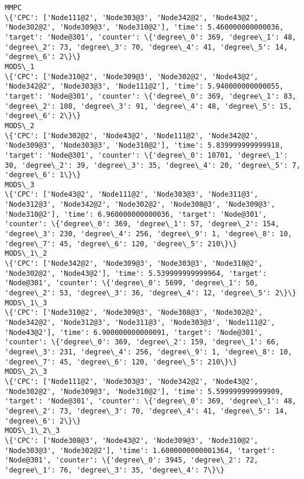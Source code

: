 \documentclass[11pt]{article}
\begin{document}
    \begin{Verbatim}[commandchars=\\\{\}]
MMPC
\{'CPC': ['Node111@2', 'Node303@3', 'Node342@2', 'Node43@2', 'Node302@2', 'Node309@3', 'Node310@2'], 'time': 5.460000000000036, 'target': 'Node@301', 'counter': \{'degree\_0': 369, 'degree\_1': 48, 'degree\_2': 73, 'degree\_3': 70, 'degree\_4': 41, 'degree\_5': 14, 'degree\_6': 2\}\}
MODS\_1
\{'CPC': ['Node310@2', 'Node309@3', 'Node302@2', 'Node43@2', 'Node342@2', 'Node303@3', 'Node111@2'], 'time': 5.940000000000055, 'target': 'Node@301', 'counter': \{'degree\_0': 369, 'degree\_1': 83, 'degree\_2': 108, 'degree\_3': 91, 'degree\_4': 48, 'degree\_5': 15, 'degree\_6': 2\}\}
MODS\_2
\{'CPC': ['Node302@2', 'Node43@2', 'Node111@2', 'Node342@2', 'Node309@3', 'Node303@3', 'Node310@2'], 'time': 5.839999999999918, 'target': 'Node@301', 'counter': \{'degree\_0': 10701, 'degree\_1': 30, 'degree\_2': 39, 'degree\_3': 35, 'degree\_4': 20, 'degree\_5': 7, 'degree\_6': 1\}\}
MODS\_3
\{'CPC': ['Node43@2', 'Node111@2', 'Node303@3', 'Node311@3', 'Node312@3', 'Node342@2', 'Node302@2', 'Node308@3', 'Node309@3', 'Node310@2'], 'time': 6.960000000000036, 'target': 'Node@301', 'counter': \{'degree\_0': 369, 'degree\_1': 57, 'degree\_2': 154, 'degree\_3': 230, 'degree\_4': 256, 'degree\_9': 1, 'degree\_8': 10, 'degree\_7': 45, 'degree\_6': 120, 'degree\_5': 210\}\}
MODS\_1\_2
\{'CPC': ['Node342@2', 'Node309@3', 'Node303@3', 'Node310@2', 'Node302@2', 'Node43@2'], 'time': 5.539999999999964, 'target': 'Node@301', 'counter': \{'degree\_0': 5699, 'degree\_1': 50, 'degree\_2': 53, 'degree\_3': 36, 'degree\_4': 12, 'degree\_5': 2\}\}
MODS\_1\_3
\{'CPC': ['Node310@2', 'Node309@3', 'Node308@3', 'Node302@2', 'Node342@2', 'Node312@3', 'Node311@3', 'Node303@3', 'Node111@2', 'Node43@2'], 'time': 6.900000000000091, 'target': 'Node@301', 'counter': \{'degree\_0': 369, 'degree\_2': 159, 'degree\_1': 66, 'degree\_3': 231, 'degree\_4': 256, 'degree\_9': 1, 'degree\_8': 10, 'degree\_7': 45, 'degree\_6': 120, 'degree\_5': 210\}\}
MODS\_2\_3
\{'CPC': ['Node111@2', 'Node303@3', 'Node342@2', 'Node43@2', 'Node302@2', 'Node309@3', 'Node310@2'], 'time': 5.599999999999909, 'target': 'Node@301', 'counter': \{'degree\_0': 369, 'degree\_1': 48, 'degree\_2': 73, 'degree\_3': 70, 'degree\_4': 41, 'degree\_5': 14, 'degree\_6': 2\}\}
MODS\_1\_2\_3
\{'CPC': ['Node308@3', 'Node43@2', 'Node309@3', 'Node310@2', 'Node303@3', 'Node302@2'], 'time': 1.6000000000001364, 'target': 'Node@301', 'counter': \{'degree\_0': 3945, 'degree\_2': 72, 'degree\_1': 76, 'degree\_3': 35, 'degree\_4': 7\}\}

    \end{Verbatim}
\end{document}
